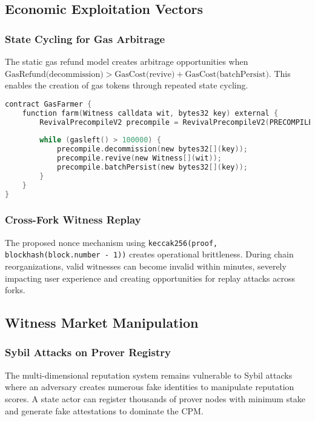 \documentclass{article}
\begin{document}
\subsection{Economic Exploitation Vectors}

\subsubsection{State Cycling for Gas Arbitrage}

The static gas refund model creates arbitrage opportunities when $\text{GasRefund(decommission)} > \text{GasCost(revive)} + \text{GasCost(batchPersist)}$. This enables the creation of gas tokens through repeated state cycling.

\begin{lstlisting}[language=C,caption={Gas Arbitrage Exploit},label={lst:gas-arbitrage}]
contract GasFarmer {
    function farm(Witness calldata wit, bytes32 key) external {
        RevivalPrecompileV2 precompile = RevivalPrecompileV2(PRECOMPILE_ADDR);
        
        while (gasleft() > 100000) {
            precompile.decommission(new bytes32[](key));
            precompile.revive(new Witness[](wit));
            precompile.batchPersist(new bytes32[](key));
        }
    }
}
\end{lstlisting}

\subsubsection{Cross-Fork Witness Replay}

The proposed nonce mechanism using \texttt{keccak256(proof, blockhash(block.number - 1))} creates operational brittleness. During chain reorganizations, valid witnesses can become invalid within minutes, severely impacting user experience and creating opportunities for replay attacks across forks.

\subsection{Witness Market Manipulation}

\subsubsection{Sybil Attacks on Prover Registry}

The multi-dimensional reputation system remains vulnerable to Sybil attacks \cite{douceur2002} where an adversary creates numerous fake identities to manipulate reputation scores. A state actor can register thousands of prover nodes with minimum stake and generate fake attestations to dominate the CPM.
\end{document}
